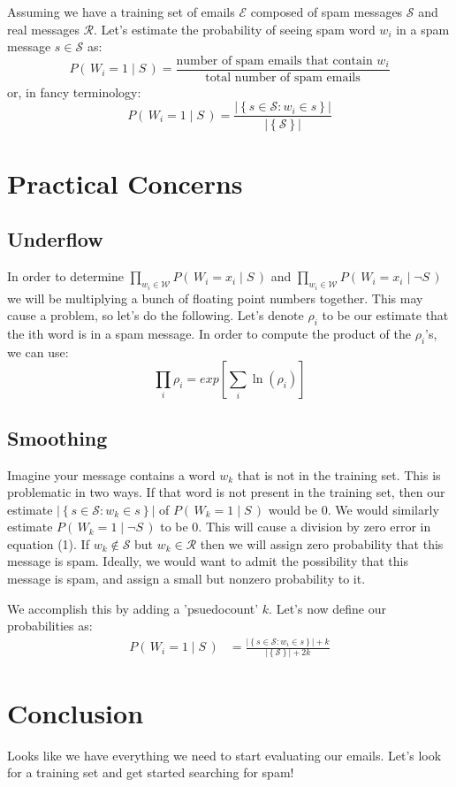 \documentclass[11pt, oneside]{article}   	%
\begin{document}
Assuming we have a training set of emails \(\mathcal{E}\) composed of spam messages \(\mathcal{S}\) and real messages \(\mathcal{R}\). Let's estimate the probability of seeing spam word $w_i$ in a spam message $s \in \mathcal{S}$ as:
\[
P(\,W_i=1 \mid S\,)=\frac{\text{number of spam emails that contain } w_i}{\text{total number of spam emails}} 
\]
or, in fancy terminology:
\begin{equation}
P(\,W_i=1 \mid S\,)=\frac{ \left\vert\left\{ s \in \mathcal{S} : w_i \in s \right\}\right\vert }{\left\vert\left\{ \mathcal{S} \right\}\right\vert}
\end{equation}

\section*{Practical Concerns}
\subsection*{Underflow} In order to determine $\prod_{w_i \in \mathcal{W}} P(\,W_i=x_i \mid S\,)$ and $\prod_{w_i \in \mathcal{W}} P(\,W_i=x_i \mid \neg S\,)$ we will be multiplying a bunch of floating point numbers together. This may cause a problem, so let's do the following. Let's denote $\rho_i$ to be our estimate that the ith word is in a spam message. In order to compute the product of the $\rho_i$'s, we can use:
\begin{equation}
\prod_i \rho_i = exp \left[ \sum_i \ln(\rho_i) \right]
\end{equation}
\subsection*{Smoothing}Imagine your message contains a word $w_k$ that is not in the training set. This is problematic in two ways. If that word is not present in the training set, then our estimate $\left\vert\left\{ s \in \mathcal{S} : w_k \in s \right\}\right\vert$ of $P(\,W_k=1 \mid S\,)$ would be 0. We would similarly estimate $P(\,W_k=1 \mid \neg S\,)$ to be 0. This will cause a division by zero error in equation (1). If $w_k \notin \mathcal{S}$ but $w_k \in \mathcal{R}$ then we will assign zero probability that this message is spam. Ideally, we would want to admit the possibility that this message is spam, and assign a small but nonzero probability to it.

We accomplish this by adding a 'psuedocount' $k$. Let's now define our probabilities as:
\begin{align}
P(\,W_i=1 \mid S\,)&=\frac{\left\vert\left\{ s \in \mathcal{S} : w_i \in s \right\}\right\vert + k}{\left\vert\left\{ \mathcal{S} \right\} \right\vert + 2k} 
\end{align}
 
\section*{Conclusion}
Looks like we have everything we need to start evaluating our emails. Let's look for a training set and get started searching for spam!
\end{document}
